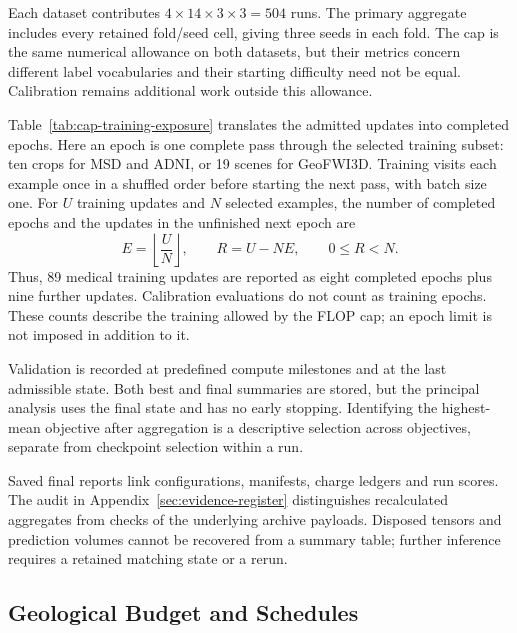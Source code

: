 \documentclass[12pt,a4paper]{article}
\begin{document}
Each dataset contributes $4\times14\times3\times3=504$ runs.
The primary aggregate includes every retained fold/seed cell, giving
three seeds in each fold. The cap is the same numerical allowance on
both datasets, but their metrics concern different label vocabularies
and their starting difficulty need not be equal. Calibration remains
additional work outside this allowance.

Table~\ref{tab:cap-training-exposure} translates the admitted updates
into completed epochs. Here an epoch is one complete pass through the
selected training subset: ten crops for MSD and ADNI, or 19 scenes for
GeoFWI3D. Training visits each example once in a shuffled order before
starting the next pass, with batch size one. For $U$ training updates
and $N$ selected examples, the number of completed epochs and the
updates in the unfinished next epoch are
\begin{equation}
 E=\left\lfloor\frac{U}{N}\right\rfloor,
 \qquad R=U-NE,\qquad 0\leq R<N.
\label{eq:completed-training-epochs}
\end{equation}
Thus, 89 medical training updates are reported as eight completed
epochs plus nine further updates. Calibration evaluations do not count
as training epochs. These counts describe the training allowed by the
FLOP cap; an epoch limit is not imposed in addition to it.



Validation is recorded at predefined compute milestones and at the last
admissible state. Both best and final summaries are stored, but the
principal analysis uses the final state and has no early stopping.
Identifying the highest-mean objective after aggregation is a descriptive
selection across objectives, separate from checkpoint selection within
a run.

Saved final reports link configurations, manifests, charge ledgers and
run scores. The audit in Appendix~\ref{sec:evidence-register} distinguishes
recalculated aggregates from checks of the underlying archive payloads.
Disposed tensors and prediction volumes cannot be recovered from a
summary table; further inference requires a retained matching state
or a rerun.

\subsection{Geological Budget and Schedules}\label{sec:geological-budget-details}
\end{document}
